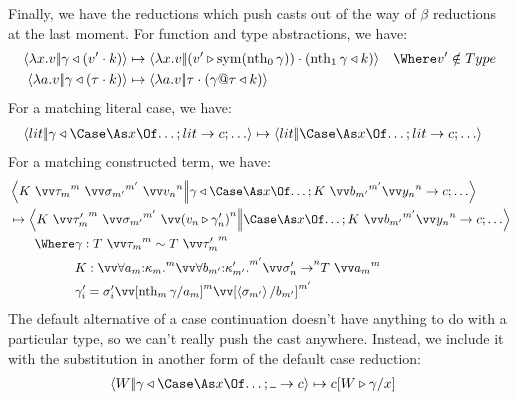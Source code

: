 \documentclass{article}
\begin{document}
Finally, we have the reductions which push casts out of the way of $\beta$
reductions at the last moment.  For function and type abstractions, we have:
\begin{align*}
  \cut{\fn x \tm}{\koerce{\cn}{(\app{\tm'}{\ko})}}
  &\sred
  \cut
  {\fn x \tm}
  {\app{(\coerce{\tm'}{\sym(\nth_0 \cn)})}{(\koerce{\nth_1 \cn}{\ko})}}
  &
  \Where
  \tm' &\notin Type
  \\
  \cut{\fn a \tm}{\koerce{\cn}{(\app{\ty}{\ko})}}
  &\sred
  \cut
  {\fn a \tm}
  {\app{\ty}{(\koerce{\instancn{\cn}{\ty}}{\ko})}}
\end{align*}
For a matching literal case, we have:
\begin{align*}
  \cut{\lit}{\koerce{\cn}{\caseas{x}{\dots;\alt{\lit}{\cmd};\dots}}}
  &\sred  
  \cut{\lit}{\caseas{x}{\dots;\alt{\lit}{\cmd};\dots}}
\end{align*}
For a matching constructed term, we have:
\begin{align*}
  &
  \cut
  {K ~ \vect[m]{\ty_{m}} ~ \vect[m']{\sty_{m'}} ~ \vect[n]{\tm_{n}}}
  {\koerce{\cn}{\caseas{x}{\dots;\alt{K ~ \vect[m']{b_{m'}} \vect[n]{y_{n}}}{\cmd};\dots}}}
  \\
  &\sred
  \cut
  {K ~ \vect[m]{\ty'_{m}} ~ \vect[m']{\sty_{m'}} ~ \vect[n]{(\coerce{\tm_{n}}{\cn'_n})}}
  {\caseas{x}{\dots;\alt{K ~ \vect[m']{b_{m'}} \vect[n]{y_{n}}}{\cmd};\dots}}
  \\
  &\qquad
  \Where
  \cn : \eqty{T ~ \vect[m]{\ty_{m}}}{T ~ \vect[m]{\ty'_{m}}}
  \\
  &\qquad\phantom{\Where}
  K 
  :
  \vect[m]{\forall\ann{a_{m}}{\ki_{m}}.}
  \vect[m']{\forall\ann{b_{m'}}{\ki'_{m'}}.}
  \vect[n]{\sty'_{n} \to} T ~ \vect[m]{a_{m}}
  \\
  &\qquad\phantom{\Where}
  \cn'_i = \sty'_i\vect[m]{\subst{a_{m}}{\nth_m \cn}}\vect[m']{\subst{b_{m'}}{\idcn{\sty_{m'}}}}
\end{align*}
The default alternative of a case continuation doesn't have anything to do with
a particular type, so we can't really push the cast anywhere.  Instead, we
include it with the substitution in another form of the default case reduction:
\begin{align*}
  \cut{\whnf}{\koerce{\cn}{\caseas{x}{\dots;\alt{\blank}{\cmd}}}}
  &\sred
  \cmd\subst{x}{\coerce{\whnf}{\cn}}
\end{align*}
\end{document}
